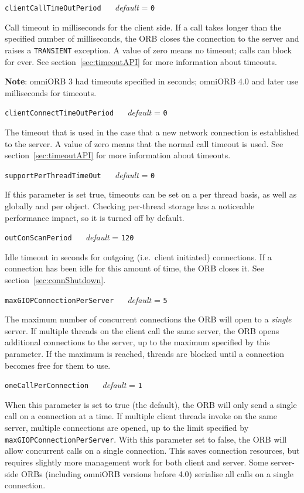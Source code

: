\documentclass[11pt,twoside,a4paper]{book}
\makeatletter
\newcommand{\code}[1]{\texttt{#1}}
\newcommand{\confopt}[2]
  {\vspace{\baselineskip}\par\noindent\code{#1} ~~ \textit{default} =
   \code{#2}}
\renewcommand{\confopt}[2]
  {\vspace{\baselineskip}\par\noindent\code{#1} ~~ \textit{default} =
   \code{#2}\\[-1ex]\@afterheading}
\newcommand{\dsc}{\discretionary{}{}{}}
\makeatother
\begin{document}
\confopt{clientCallTimeOutPeriod}{0}

Call timeout in milliseconds for the client side. If a call takes
longer than the specified number of milliseconds, the ORB closes the
connection to the server and raises a \code{TRANSIENT} exception. A
value of zero means no timeout; calls can block for ever. See
section~\ref{sec:timeoutAPI} for more information about timeouts.

\vspace{.5\baselineskip}

\noindent\textbf{Note}: omniORB 3 had timeouts specified in seconds;
omniORB 4.0 and later use milliseconds for timeouts.


\confopt{clientConnectTimeOutPeriod}{0}

The timeout that is used in the case that a new network connection is
established to the server. A value of zero means that the normal call
timeout is used. See section~\ref{sec:timeoutAPI} for more information
about timeouts.


\confopt{supportPerThreadTimeOut}{0}

If this parameter is set true, timeouts can be set on a per thread
basis, as well as globally and per object. Checking per-thread storage
has a noticeable performance impact, so it is turned off by default.


\confopt{outConScanPeriod}{120}

Idle timeout in seconds for outgoing (i.e.\ client initiated)
connections. If a connection has been idle for this amount of time,
the ORB closes it. See section~\ref{sec:connShutdown}.


\confopt{maxGIOPConnectionPerServer}{5}

The maximum number of concurrent connections the ORB will open to a
\emph{single} server. If multiple threads on the client call the same
server, the ORB opens additional connections to the server, up to the
maximum specified by this parameter. If the maximum is reached,
threads are blocked until a connection becomes free for them to use.


\confopt{oneCallPerConnection}{1}

When this parameter is set to true (the default), the ORB will only
send a single call on a connection at a time. If multiple client
threads invoke on the same server, multiple connections are opened, up
to the limit specified by
\code{maxGIOPConnection\dsc{}PerServer}. With this parameter set to
false, the ORB will allow concurrent calls on a single
connection. This saves connection resources, but requires slightly
more management work for both client and server. Some server-side ORBs
(including omniORB versions before 4.0) serialise all calls on a
single connection.
\end{document}
